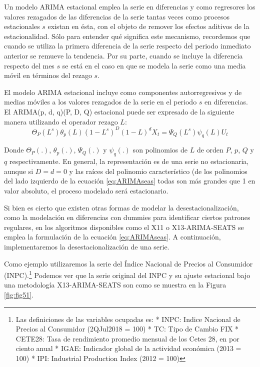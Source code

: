 \documentclass[
]{book}
\begin{document}
Un modelo ARIMA estacional emplea la serie en diferencias y como regresores los valores rezagados de las diferencias de la serie tantas veces como procesos estacionales \(s\) existan en ésta, con el objeto de remover los efectos aditivos de la estacionalidad. Sólo para entender qué significa este mecanismo, recordemos que cuando se utiliza la primera diferencia de la serie respecto del periodo inmediato anterior se remueve la tendencia. Por su parte, cuando se incluye la diferencia respecto del mes \(s\) se está en el caso en que se modela la serie como una media móvil en términos del rezago \(s\).

El modelo ARIMA estacional incluye como componentes autorregresivos y de medias móviles a los valores rezagados de la serie en el periodo \(s\) en diferencias. El ARIMA(p, d, q)(P, D, Q) estacional puede ser expresado de la siguiente manera utilizando el operador rezago \(L\):
\begin{equation}
    \Theta_P(L^s) \theta_p(L) (1 - L^s)^D (1 - L)^d X_t = \Psi_Q(L^s) \psi_q(L) U_t
    \label{eq:ARIMAseas}
\end{equation}

Donde \(\Theta_P(.)\), \(\theta_p(.)\), \(\Psi_Q(.)\) y \(\psi_q(.)\) son polinomios de \(L\) de orden \(P\), \(p\), \(Q\) y \(q\) respectivamente. En general, la representación es de una serie no estacionaria, aunque si \(D = d = 0\) y las raíces del polinomio característico (de los polinomios del lado izquierdo de la ecuación \eqref{eq:ARIMAseas} todas son más grandes que 1 en valor absoluto, el proceso modelado será estacionario.

Si bien es cierto que existen otras formas de modelar la desestacionalización, como la modelación en diferencias con dummies para identificar ciertos patrones regulares, en los algoritmos disponibles como el X11 o X13-ARIMA-SEATS se emplea la formulación de la ecuación \eqref{eq:ARIMAseas}. A continuación, implementaremos la desestacionalización de una serie.

Como ejemplo utilizaremos la serie del Índice Nacional de Precios al Consumidor (INPC).\footnote{Las definiciones de las variables ocupadas es:
* INPC: Indice Nacional de Precios al Consumidor (2QJul2018 = 100)
* TC: Tipo de Cambio FIX 
* CETE28: Tasa de rendimiento promedio mensual de los Cetes 28, en por ciento anual
* IGAE: Indicador global de la actividad económica (2013 = 100)
* IPI: Industrial Production Index (2012 = 100)
} Podemos ver que la serie original del INPC y su ajuste estacional bajo una metodología X13-ARIMA-SEATS son como se muestra en la Figura \ref{fig:fig51}.
\end{document}

